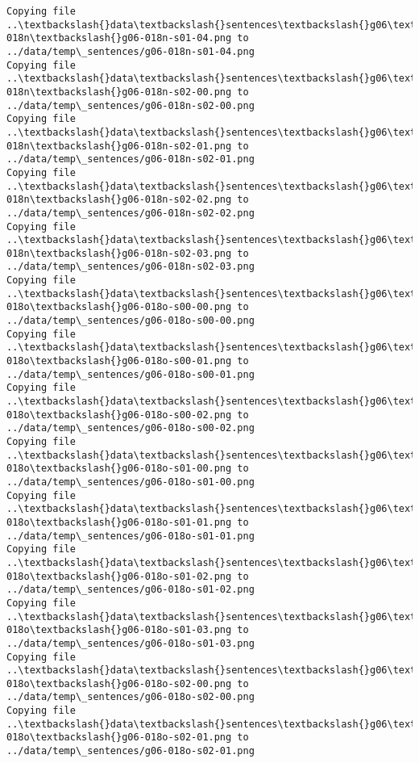 \documentclass[11pt]{article}
\begin{document}
\begin{Verbatim}[commandchars=\\\{\}]
Copying file ..\textbackslash{}data\textbackslash{}sentences\textbackslash{}g06\textbackslash{}g06-018n\textbackslash{}g06-018n-s01-04.png to
../data/temp\_sentences/g06-018n-s01-04.png
Copying file ..\textbackslash{}data\textbackslash{}sentences\textbackslash{}g06\textbackslash{}g06-018n\textbackslash{}g06-018n-s02-00.png to
../data/temp\_sentences/g06-018n-s02-00.png
Copying file ..\textbackslash{}data\textbackslash{}sentences\textbackslash{}g06\textbackslash{}g06-018n\textbackslash{}g06-018n-s02-01.png to
../data/temp\_sentences/g06-018n-s02-01.png
Copying file ..\textbackslash{}data\textbackslash{}sentences\textbackslash{}g06\textbackslash{}g06-018n\textbackslash{}g06-018n-s02-02.png to
../data/temp\_sentences/g06-018n-s02-02.png
Copying file ..\textbackslash{}data\textbackslash{}sentences\textbackslash{}g06\textbackslash{}g06-018n\textbackslash{}g06-018n-s02-03.png to
../data/temp\_sentences/g06-018n-s02-03.png
Copying file ..\textbackslash{}data\textbackslash{}sentences\textbackslash{}g06\textbackslash{}g06-018o\textbackslash{}g06-018o-s00-00.png to
../data/temp\_sentences/g06-018o-s00-00.png
Copying file ..\textbackslash{}data\textbackslash{}sentences\textbackslash{}g06\textbackslash{}g06-018o\textbackslash{}g06-018o-s00-01.png to
../data/temp\_sentences/g06-018o-s00-01.png
Copying file ..\textbackslash{}data\textbackslash{}sentences\textbackslash{}g06\textbackslash{}g06-018o\textbackslash{}g06-018o-s00-02.png to
../data/temp\_sentences/g06-018o-s00-02.png
Copying file ..\textbackslash{}data\textbackslash{}sentences\textbackslash{}g06\textbackslash{}g06-018o\textbackslash{}g06-018o-s01-00.png to
../data/temp\_sentences/g06-018o-s01-00.png
Copying file ..\textbackslash{}data\textbackslash{}sentences\textbackslash{}g06\textbackslash{}g06-018o\textbackslash{}g06-018o-s01-01.png to
../data/temp\_sentences/g06-018o-s01-01.png
Copying file ..\textbackslash{}data\textbackslash{}sentences\textbackslash{}g06\textbackslash{}g06-018o\textbackslash{}g06-018o-s01-02.png to
../data/temp\_sentences/g06-018o-s01-02.png
Copying file ..\textbackslash{}data\textbackslash{}sentences\textbackslash{}g06\textbackslash{}g06-018o\textbackslash{}g06-018o-s01-03.png to
../data/temp\_sentences/g06-018o-s01-03.png
Copying file ..\textbackslash{}data\textbackslash{}sentences\textbackslash{}g06\textbackslash{}g06-018o\textbackslash{}g06-018o-s02-00.png to
../data/temp\_sentences/g06-018o-s02-00.png
Copying file ..\textbackslash{}data\textbackslash{}sentences\textbackslash{}g06\textbackslash{}g06-018o\textbackslash{}g06-018o-s02-01.png to
../data/temp\_sentences/g06-018o-s02-01.png

\end{Verbatim}
\end{document}
